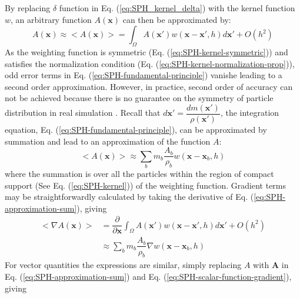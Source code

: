 By replacing $\delta$ function in Eq. (\ref{eq:SPH_kernel_delta}) with the kernel function $w$, an arbitrary function $A\left(\textbf{x}\right)$ can then be approximated by:
\begin{equation}
A\left(\textbf{x}\right) \approx <A\left(\textbf{x}\right)> = \int_{\Omega} A\left(\textbf{x} \prime\right) w\left(\textbf{x}-\textbf{x}\prime, h\right) d\textbf{x}\prime + O\left(h^2\right)
\label{eq:SPH-fundamental-principle}
\end{equation}
As the weighting function is symmetric (Eq. (\ref{eq:SPH-kernel-symmetric})) and satisfies the normalization condition (Eq. (\ref{eq:SPH-kernel-normalization-prop})), odd error terms in Eq. (\ref{eq:SPH-fundamental-principle}) vanishe leading to a second order approximation. However, in practice, second order of accuracy can not be achieved because there is no guarantee on the symmetry of particle distribution in real simulation \citep{price2012smoothed}.
Recall that $d\textbf{x}\prime = \dfrac{dm (\textbf{x} \prime)}{\rho (\textbf{x} \prime)}$, the integration equation, Eq. (\ref{eq:SPH-fundamental-principle}), can be approximated by summation and lead to an approximation of the function $A$:
\begin{equation}
<A\left(\textbf{x}\right)> \approx \sum_b m_b \dfrac{A_b}{\rho_b} w\left(\textbf{x}-\textbf{x}_b, h\right)
\label{eq:SPH-approximation-sum}
\end{equation}
where the summation is over all the particles within the region of compact support (See Eq. (\ref{eq:SPH-kernel})) of the weighting function. 
Gradient terms may be straightforwardly calculated by taking the derivative of Eq. (\ref{eq:SPH-approximation-sum}), giving
\begin{equation}
\begin{split}
<\nabla A\left(\textbf{x}\right)> & = \dfrac{\partial }{\partial \textbf{x}} \int_{\Omega} A\left(\textbf{x} \prime\right) w\left(\textbf{x}-\textbf{x}\prime, h\right) d\textbf{x}\prime + O\left(h^2\right) \\
& \approx \sum_b m_b \dfrac{A_b}{\rho_b} \nabla w\left(\textbf{x} - \textbf{x}_b, h\right)
\end{split} 
\label{eq:SPH-scalar-function-gradient}
\end{equation}
For vector quantities the expressions are similar, simply replacing $A$ with $\textbf{A}$ in Eq. (\ref{eq:SPH-approximation-sum}) and Eq. (\ref{eq:SPH-scalar-function-gradient}), giving

